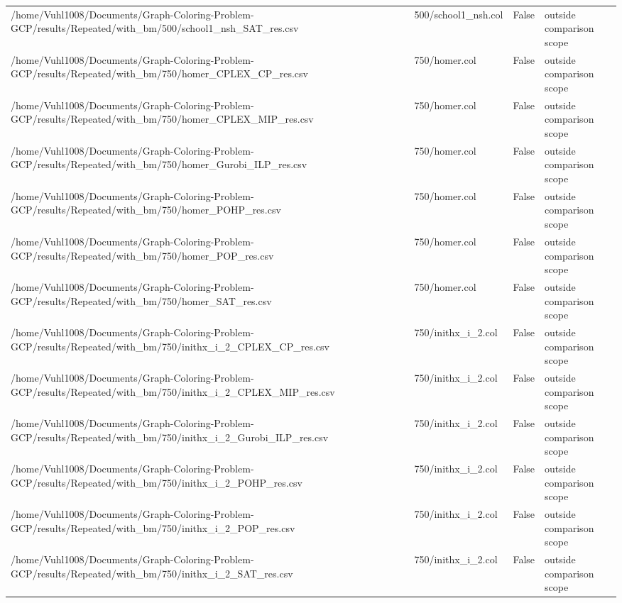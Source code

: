 \begin{table}[htbp]
\begin{tabular}{llll}
/home/Vuhl1008/Documents/Graph-Coloring-Problem-GCP/results/Repeated/with\_bm/500/school1\_nsh\_SAT\_res.csv & 500/school1\_nsh.col & False & outside comparison scope \\
/home/Vuhl1008/Documents/Graph-Coloring-Problem-GCP/results/Repeated/with\_bm/750/homer\_CPLEX\_CP\_res.csv & 750/homer.col & False & outside comparison scope \\
/home/Vuhl1008/Documents/Graph-Coloring-Problem-GCP/results/Repeated/with\_bm/750/homer\_CPLEX\_MIP\_res.csv & 750/homer.col & False & outside comparison scope \\
/home/Vuhl1008/Documents/Graph-Coloring-Problem-GCP/results/Repeated/with\_bm/750/homer\_Gurobi\_ILP\_res.csv & 750/homer.col & False & outside comparison scope \\
/home/Vuhl1008/Documents/Graph-Coloring-Problem-GCP/results/Repeated/with\_bm/750/homer\_POHP\_res.csv & 750/homer.col & False & outside comparison scope \\
/home/Vuhl1008/Documents/Graph-Coloring-Problem-GCP/results/Repeated/with\_bm/750/homer\_POP\_res.csv & 750/homer.col & False & outside comparison scope \\
/home/Vuhl1008/Documents/Graph-Coloring-Problem-GCP/results/Repeated/with\_bm/750/homer\_SAT\_res.csv & 750/homer.col & False & outside comparison scope \\
/home/Vuhl1008/Documents/Graph-Coloring-Problem-GCP/results/Repeated/with\_bm/750/inithx\_i\_2\_CPLEX\_CP\_res.csv & 750/inithx\_i\_2.col & False & outside comparison scope \\
/home/Vuhl1008/Documents/Graph-Coloring-Problem-GCP/results/Repeated/with\_bm/750/inithx\_i\_2\_CPLEX\_MIP\_res.csv & 750/inithx\_i\_2.col & False & outside comparison scope \\
/home/Vuhl1008/Documents/Graph-Coloring-Problem-GCP/results/Repeated/with\_bm/750/inithx\_i\_2\_Gurobi\_ILP\_res.csv & 750/inithx\_i\_2.col & False & outside comparison scope \\
/home/Vuhl1008/Documents/Graph-Coloring-Problem-GCP/results/Repeated/with\_bm/750/inithx\_i\_2\_POHP\_res.csv & 750/inithx\_i\_2.col & False & outside comparison scope \\
/home/Vuhl1008/Documents/Graph-Coloring-Problem-GCP/results/Repeated/with\_bm/750/inithx\_i\_2\_POP\_res.csv & 750/inithx\_i\_2.col & False & outside comparison scope \\
/home/Vuhl1008/Documents/Graph-Coloring-Problem-GCP/results/Repeated/with\_bm/750/inithx\_i\_2\_SAT\_res.csv & 750/inithx\_i\_2.col & False & outside comparison scope \\

\end{tabular}
\end{table}
